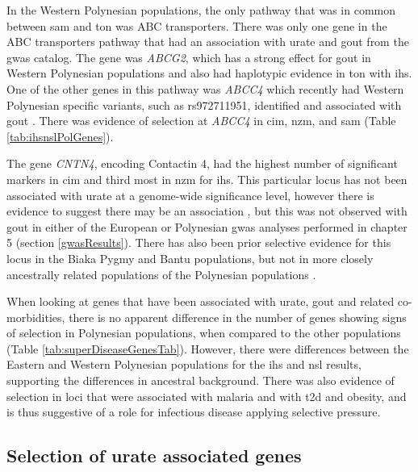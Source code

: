 \documentclass[]{report}
\begin{document}
In the Western Polynesian populations, the only pathway that was in
common between \gls{sam} and \gls{ton} was ABC transporters. There was
only one gene in the ABC transporters pathway that had an association
with urate and gout from the \gls{gwas} catalog. The gene was
\emph{ABCG2}, which has a strong effect for gout in Western Polynesian
populations \citep{Phipps-Green2010} and also had haplotypic evidence in
\gls{ton} with \gls{ihs}. One of the other genes in this pathway was
\emph{ABCC4} which recently had Western Polynesian specific variants,
such as rs972711951, identified and associated with gout
\citep{Tanner2017}. There was evidence of selection at \emph{ABCC4} in
\gls{cim}, \gls{nzm}, and \gls{sam} (Table \ref{tab:ihsnslPolGenes}).

The gene \emph{CNTN4}, encoding Contactin 4, had the highest number of
significant markers in \gls{cim} and third most in \gls{nzm} for
\gls{ihs}. This particular locus has not been associated with urate at a
genome-wide significance level, however there is evidence to suggest
there may be an association \citep{Chittoor2016}, but this was not
observed with gout in either of the European or Polynesian \gls{gwas}
analyses performed in chapter 5 (section \ref{gwasResults}). There has
also been prior selective evidence for this locus in the Biaka Pygmy and
Bantu populations, but not in more closely ancestrally related
populations of the Polynesian populations \citep{pickrell2009signals}.

When looking at genes that have been associated with urate, gout and
related co-morbidities, there is no apparent difference in the number of
genes showing signs of selection in Polynesian populations, when
compared to the other populations (Table
\ref{tab:superDiseaseGenesTab}). However, there were differences between
the Eastern and Western Polynesian populations for the \gls{ihs} and
\gls{nsl} results, supporting the differences in ancestral background.
There was also evidence of selection in loci that were associated with
malaria and with \gls{t2d} and obesity, and is thus suggestive of a role
for infectious disease applying selective pressure.

\subsection{Selection of urate associated
genes}\label{selection-of-urate-associated-genes}
\end{document}
